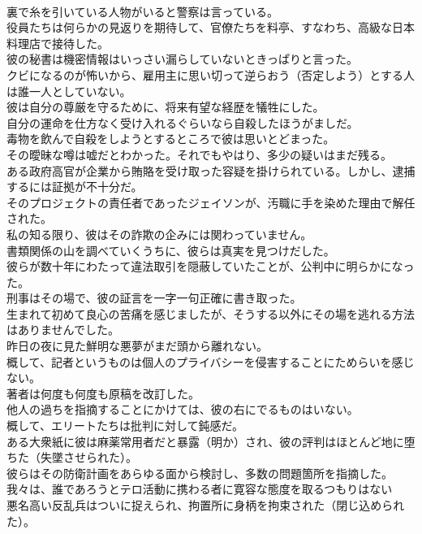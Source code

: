 \documentclass[8pt]{extreport}
\begin{document}
\begin{CJK}{UTF8}{min}
\\	裏で糸を引いている人物がいると警察は言っている。
\\	役員たちは何らかの見返りを期待して、官僚たちを料亭、すなわち、高級な日本料理店で接待した。
\\	彼の秘書は機密情報はいっさい漏らしていないときっぱりと言った。
\\	クビになるのが怖いから、雇用主に思い切って逆らおう（否定しよう）とする人は誰一人としていない。
\\	彼は自分の尊厳を守るために、将来有望な経歴を犠牲にした。
\\	自分の運命を仕方なく受け入れるぐらいなら自殺したほうがましだ。
\\	毒物を飲んで自殺をしようとするところで彼は思いとどまった。
\\	その曖昧な噂は嘘だとわかった。それでもやはり、多少の疑いはまだ残る。
\\	ある政府高官が企業から賄賂を受け取った容疑を掛けられている。しかし、逮捕するには証拠が不十分だ。
\\	そのプロジェクトの責任者であったジェイソンが、汚職に手を染めた理由で解任された。
\\	私の知る限り、彼はその詐欺の企みには関わっていません。
\\	書類関係の山を調べていくうちに、彼らは真実を見つけだした。
\\	彼らが数十年にわたって違法取引を隠蔽していたことが、公判中に明らかになった。
\\	刑事はその場で、彼の証言を一字一句正確に書き取った。
\\	生まれて初めて良心の苦痛を感じましたが、そうする以外にその場を逃れる方法はありませんでした。
\\	昨日の夜に見た鮮明な悪夢がまだ頭から離れない。
\\	概して、記者というものは個人のプライバシーを侵害することにためらいを感じない。
\\	著者は何度も何度も原稿を改訂した。
\\	他人の過ちを指摘することにかけては、彼の右にでるものはいない。
\\	概して、エリートたちは批判に対して鈍感だ。
\\	ある大衆紙に彼は麻薬常用者だと暴露（明か）され、彼の評判はほとんど地に堕ちた（失墜させられた）。
\\	彼らはその防衛計画をあらゆる面から検討し、多数の問題箇所を指摘した。
\\	我々は、誰であろうとテロ活動に携わる者に寛容な態度を取るつもりはない
\\	悪名高い反乱兵はついに捉えられ、拘置所に身柄を拘束された（閉じ込められた）。

\end{CJK}
\end{document}
